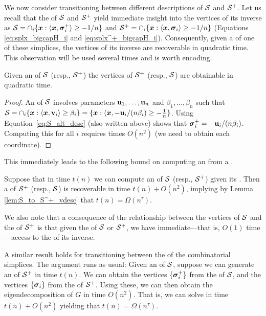  We now consider transitioning between different descriptions of $\mathcal{S}$ and $\mathcal{S}^+$. Let us recall that the \hdesc of $\mathcal{S}$ and $\mathcal{S}^+$ yield immediate insight into the vertices of its inverse as $\mathcal{S}=\cap_i \{\vb*{x}:\langle \vb*{x},\vb*{\sigma}_i^+\rangle \geq -1/n\}$ and $\mathcal{S}^+=\cap_i\{\vb*{x}:\langle\vb*{x},\vb*{\sigma}_i\rangle \geq -1/n\}$ (Equations \eqref{eq:splx_bigcapH_i} and \eqref{eq:splx^+_bigcapH_i}). Consequently, given a \hdesc of one of these simplices, the vertices of its inverse are recoverable in quadratic time. This observation will be used several times and is  worth encoding. 
 
 \begin{observation}
 	\label{obs:HtoV}
 	Given  an  \hdesc of $\mathcal{S}$ (resp., $\mathcal{S}^+$)  the vertices of $\mathcal{S}^+$ (resp., $\mathcal{S}$) are obtainable in quadratic time.
 \end{observation}
\begin{proof}
	An \hdesc of $\mathcal{S}$  involves parameters  $\vb{u}_1,\dots,\vb{u}_n$ and $\beta_1,\dots,\beta_n$ such that $\mathcal{S}=\cap_i \{\vb*{x}:\langle \vb*{x},\vb{v}_i\rangle \geq  \beta_i\}=\{\vb*{x}:\langle \vb*{x},-\vb{u}_i/(n\beta_i )\geq -\frac{1}{n}\}$. Using  Equation~\eqref{eq:S_alt_desc} (also written above) shows  that $\vb*{\sigma}_i^+=-\vb{u}_i/(n\beta_i)$.  Computing this  for all $i$ requires  times  $O(n^2)$ (we need  to obtain each coordinate).  
\end{proof}
 
 This immediately  leads to the following bound on computing an \hdesc from a \vdesc. 
 
 \begin{lemma}
 	\label{lem:S_vdesc_to_hdesc}
	 Suppose that in time $t(n)$ we can compute an \hdesc of $\mathcal{S}$ (resp., $\mathcal{S}^+$) given its \vdesc. Then a \vdesc of $\mathcal{S}^+$ (resp., $\mathcal{S}$) is recoverable in time $t(n) + O(n^2)$, implying by Lemma \ref{lem:S_to_S^+_vdesc} that $t(n) = \Omega(n^\tau)$. 
 \end{lemma}

We also note that a consequence of the relationship between the vertices of $\mathcal{S}$ and the \hdesc of $\mathcal{S}^+$ is that given the \vdesc of $\mathcal{S}$ or $\mathcal{S}^+$, we have immediate---that is,  $O(1)$ time---access to the \hdesc of its inverse. 

A similar result holds for transitioning between the \hdesc of the combinatorial simplices. The argument runs as usual: Given an \hdesc of $\mathcal{S}$, suppose we can generate an \hdesc of $\mathcal{S}^+$ in time $t(n)$. We can obtain the vertices $\{\vb*{\sigma}_i^+\}$ from the \hdesc of $\mathcal{S}$, and the vertices $\{\vb*{\sigma}_i\}$ from the \hdesc of $\mathcal{S}^+$. Using these, we can then obtain the eigendecomposition of $G$ in time $O(n^2)$. That is, we can solve \lapdecomp in time $t(n) + O(n^2)$ yielding that $t(n) = \Omega(n^\tau)$. 

